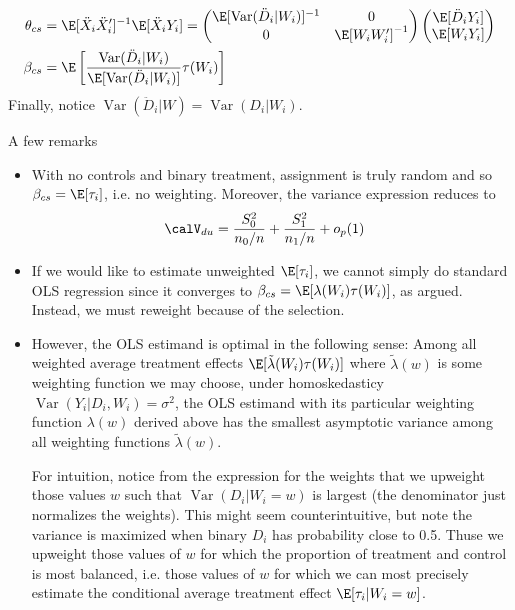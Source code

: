 \documentclass[12pt]{article}
\theoremstyle{plain}
\theoremstyle{definition}
\theoremstyle{remark}
\newcommand{\Var}{\operatorname{Var}}
\begin{document}
\begin{enumerate}
\begin{align*}
      {\theta}_{cs}
      &=
      \E[\ddot{X}_i\ddot{X}_i']^{-1}
      \E[\ddot{X}_i{Y}_i]
      =
      \begin{pmatrix}
        \E[\Var(\ddot{D}_i|W_i)]^{-1}
        &
        0
        \\
        0
        &
        \E[W_iW_i']^{-1}
      \end{pmatrix}
      \begin{pmatrix}
        \E[\ddot{D}_iY_i]
        \\
        \E[W_iY_i]
      \end{pmatrix}
      \\
      \beta_{cs}
      &=
      \E\left[
        \frac{%
          \Var(\ddot{D}_i|W_i)
        }{%
          \E[\Var(\ddot{D}_i|W_i)]
        }
        \tau(W_i)
      \right]
    \end{align*}
    Finally, notice $\Var(\ddot{D}_i|W)=\Var(D_i|W_i)$.

    A few remarks
    \begin{itemize}
      \item With no controls and binary treatment, assignment is truly
        random and so $\beta_{cs}=\E[\tau_i]$, i.e. no weighting.
        Moreover, the variance expression reduces to
        \begin{align*}
          \calV_{du}
          &=
          \frac{S_0^2}{n_0/n}
          +
          \frac{S_1^2}{n_1/n}
          +
          o_p(1)
        \end{align*}

      \item If we would like to estimate unweighted $\E[\tau_i]$,
        we cannot simply do standard OLS regression since it converges
        to $\beta_{cs}=\E[\lambda(W_i)\tau(W_i)]$, as argued.
        Instead, we must reweight because of the selection.


      \item However, the OLS estimand is optimal in the following sense:
        Among all weighted average treatment effects
        $\E[\tilde{\lambda}(W_i)\tau(W_i)]$ where $\tilde{\lambda}(w)$
        is some weighting function we may choose,
        under homoskedasticy $\Var(Y_i|D_i,W_i)=\sigma^2$,
        the OLS estimand with its particular weighting function
        $\lambda(w)$ derived above has the smallest asymptotic variance
        among all weighting functions $\tilde{\lambda}(w)$.

        For intuition, notice from the expression for the weights that
        we upweight those values $w$ such that $\Var(D_i|W_i=w)$ is
        largest (the denominator just normalizes the weights).
        This might seem counterintuitive, but note the variance is
        maximized when binary $D_i$ has probability close to 0.5.
        Thuse we upweight those values of $w$ for which the proportion
        of treatment and control is most balanced, i.e. those values of
        $w$ for which we can most precisely estimate the conditional
        average treatment effect $\E[\tau_i|W_i=w]$.


\end{itemize}
\end{enumerate}
\end{document}
